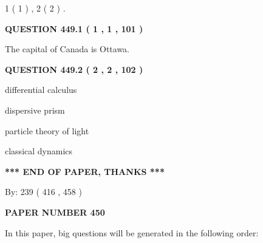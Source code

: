 \documentclass[12pt]{article}
\begin{document}
   
   1 ( 1 )
 ,
   2 ( 2 )
 .
  
\vspace{0.2in}
  
{\textbf{\Large{QUESTION
449.1 
 ( 1 , 1 , 101 )
}}}
  
  
 
 
\noindent{}
 
 
The capital of Canada is Ottawa.
 
 
 
 
  
\vspace{0.2in}
  
{\textbf{\Large{QUESTION
449.2 
 ( 2 , 2 , 102 )
}}}
  
  
 
 
\noindent{}
 
 
differential calculus
 
 
dispersive prism
 
 
particle theory of light
 
 
classical dynamics
 
 
 
 
   
   
\vspace{1.0in} 
{\textbf{\large{ *** END OF PAPER, THANKS *** }}} 
   
   
\hspace{1.0in} By: 
 239 ( 416 ,  458 )
   
   
   
   
\newpage 
\setcounter{page}{ 
   450001 } 
   
   
   
   
 {\textbf{ \Large{ PAPER NUMBER  450  }}}
   
   
\vspace{0.2in}
   
   
   
   
   
\vspace{0.2in}
   
In this paper, big questions will be generated in the following order: 
   
\end{document}
